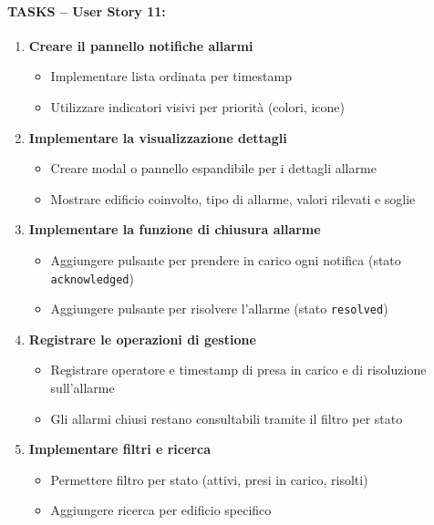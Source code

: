 \paragraph*{TASKS – User Story 11:}
\begin{enumerate}
    \item \textbf{Creare il pannello notifiche allarmi}
    \begin{itemize}
        \item Implementare lista ordinata per timestamp
        \item Utilizzare indicatori visivi per priorità (colori, icone)
    \end{itemize}
    \item \textbf{Implementare la visualizzazione dettagli}
    \begin{itemize}
        \item Creare modal o pannello espandibile per i dettagli allarme
        \item Mostrare edificio coinvolto, tipo di allarme, valori rilevati e soglie
    \end{itemize}
    \item \textbf{Implementare la funzione di chiusura allarme}
    \begin{itemize}
        \item Aggiungere pulsante per prendere in carico ogni notifica (stato \texttt{acknowledged})
        \item Aggiungere pulsante per risolvere l'allarme (stato \texttt{resolved})
    \end{itemize}
    \item \textbf{Registrare le operazioni di gestione}
    \begin{itemize}
        \item Registrare operatore e timestamp di presa in carico e di risoluzione sull'allarme
        \item Gli allarmi chiusi restano consultabili tramite il filtro per stato
    \end{itemize}
    \item \textbf{Implementare filtri e ricerca}
    \begin{itemize}
        \item Permettere filtro per stato (attivi, presi in carico, risolti)
        \item Aggiungere ricerca per edificio specifico
    \end{itemize}
\end{enumerate}


